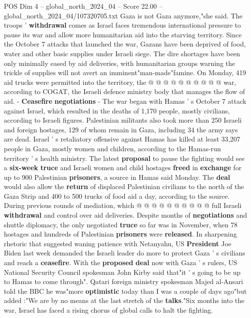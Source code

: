 \begin{textsample}{POS Dim 4 – global\_north\_2024\_04 – Score 22.00 – global\_north\_2024\_04/107320705.txt}
Gaza is not Gaza anymore,"she said.
The troops ' \textbf{withdrawal} comes as Israel faces tremendous international pressure to pause its war and allow more humanitarian aid into the starving territory.
Since the October 7 attacks that launched the war, Gazans have been deprived of food, water and other basic supplies under Israeli siege.
The dire shortages have been only minimally eased by aid deliveries, with humanitarian groups warning the trickle of supplies will not avert an imminent"man-made"famine.
On Monday, 419 aid trucks were permitted into the territory, the @ @ @ @ @ @ @ @ @ @ war, according to COGAT, the Israeli defence ministry body that manages the flow of aid. - \textbf{Ceasefire} \textbf{negotiations} - The war began with Hamas ' s October 7 attack against Israel, which resulted in the deaths of 1,170 people, mostly civilians, according to Israeli figures.
Palestinian militants also took more than 250 Israeli and foreign hostages, 129 of whom remain in Gaza, including 34 the army says are dead.
Israel ' s retaliatory offensive against Hamas has killed at least 33,207 people in Gaza, mostly women and children, according to the Hamas-run territory ' s health ministry.
The latest \textbf{proposal} to pause the fighting would see a \textbf{six-week} \textbf{truce} and Israeli women and child hostages \textbf{freed} in \textbf{exchange} for up to 900 Palestinian \textbf{prisoners}, a source in Hamas said Monday.
The \textbf{deal} would also allow the \textbf{return} of displaced Palestinian civilians to the north of the Gaza Strip and 400 to 500 trucks of food aid a day, according to the source.
During previous rounds of mediation, which @ @ @ @ @ @ @ @ @ @ full Israeli \textbf{withdrawal} and control over aid deliveries.
Despite months of \textbf{negotiations} and shuttle diplomacy, the only negotiated \textbf{truce} so far was in November, when 78 hostages and hundreds of Palestinian \textbf{prisoners} were \textbf{released}.
In sharpening rhetoric that suggested waning patience with Netanyahu, US \textbf{President} Joe Biden last week demanded the Israeli leader do more to protect Gaza ' s civilians and reach a \textbf{ceasefire}.
With the \textbf{proposed} \textbf{deal} now with Gaza ' s rulers, US National Security Council spokesman John Kirby said that"it ' s going to be up to Hamas to come through".
Qatari foreign ministry spokesman Majed al-Ansari told the BBC he was"more \textbf{optimistic} today than I was a couple of days ago"but added :"We are by no means at the last stretch of the \textbf{talks}."Six months into the war, Israel has faced a rising chorus of global calls to halt the fighting.

\end{textsample}
